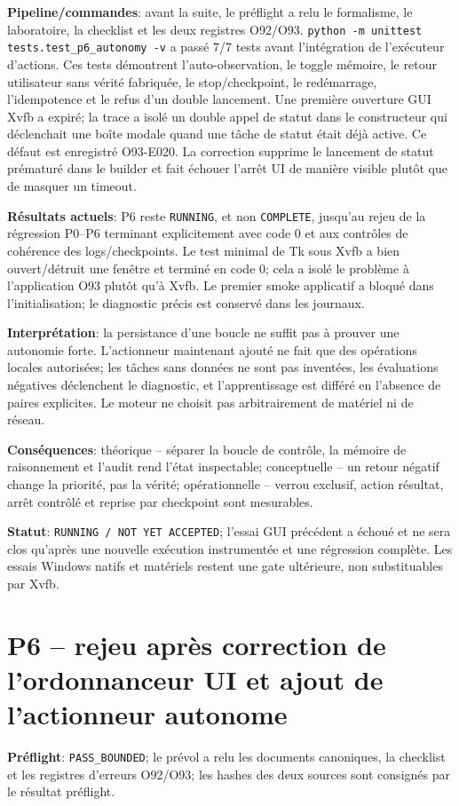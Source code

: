 \documentclass[11pt,a4paper,oneside]{report}
\begin{document}
\textbf{Pipeline/commandes}: avant la suite, le préflight a relu le formalisme, le laboratoire, la checklist et les deux registres O92/O93. \texttt{python -m unittest tests.test\_p6\_autonomy -v} a passé 7/7 tests avant l’intégration de l’exécuteur d’actions. Ces tests démontrent l’auto-observation, le toggle mémoire, le retour utilisateur sans vérité fabriquée, le stop/checkpoint, le redémarrage, l’idempotence et le refus d’un double lancement. Une première ouverture GUI Xvfb a expiré; la trace a isolé un double appel de statut dans le constructeur qui déclenchait une boîte modale quand une tâche de statut était déjà active. Ce défaut est enregistré O93-E020. La correction supprime le lancement de statut prématuré dans le builder et fait échouer l’arrêt UI de manière visible plutôt que de masquer un timeout.

\textbf{Résultats actuels}: P6 reste \texttt{RUNNING}, et non \texttt{COMPLETE}, jusqu’au rejeu de la régression P0--P6 terminant explicitement avec code 0 et aux contrôles de cohérence des logs/checkpoints. Le test minimal de Tk sous Xvfb a bien ouvert/détruit une fenêtre et terminé en code 0; cela a isolé le problème à l’application O93 plutôt qu’à Xvfb. Le premier smoke applicatif a bloqué dans l’initialisation; le diagnostic précis est conservé dans les journaux.

\textbf{Interprétation}: la persistance d’une boucle ne suffit pas à prouver une autonomie forte. L’actionneur maintenant ajouté ne fait que des opérations locales autorisées; les tâches sans données ne sont pas inventées, les évaluations négatives déclenchent le diagnostic, et l’apprentissage est différé en l’absence de paires explicites. Le moteur ne choisit pas arbitrairement de matériel ni de réseau.

\textbf{Conséquences}: théorique -- séparer la boucle de contrôle, la mémoire de raisonnement et l’audit rend l’état inspectable; conceptuelle -- un retour négatif change la priorité, pas la vérité; opérationnelle -- verrou exclusif, action résultat, arrêt contrôlé et reprise par checkpoint sont mesurables.

\textbf{Statut}: \texttt{RUNNING / NOT YET ACCEPTED}; l’essai GUI précédent a échoué et ne sera clos qu’après une nouvelle exécution instrumentée et une régression complète. Les essais Windows natifs et matériels restent une gate ultérieure, non substituables par Xvfb.


\section{P6 -- rejeu après correction de l'ordonnanceur UI et ajout de l'actionneur autonome}
\textbf{Préflight}: \texttt{PASS\_BOUNDED}; le prévol a relu les documents canoniques, la checklist et les registres d'erreurs O92/O93; les hashes des deux sources sont consignés par le résultat préflight.
\end{document}
